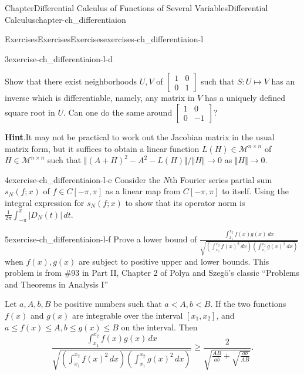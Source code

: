 \documentclass[oneside,10pt,]{book}
\newcommand{\blocktitlefont}{\relax}
\numberwithin{equation}{section}
\newcommand{\cM}{\mathcal{M}}
\newcommand{\lt}{<}
\newcommand{\amp}{&}
\begin{document}
\begin{chapterptx}{Chapter}{Differential Calculus of Functions of Several Variables}{}{Differential Calculus}{}{}{chapter-ch_differentiaion}
\begin{exercises-section}{Exercises}{Exercises}{}{Exercises}{}{}{exercises-ch_differentiaion-l}
\begin{divisionexercise}{3}{}{}{exercise-ch_differentiaion-l-d}
\par
Show that there exist  neighborhoods \(U, V\) of \(\begin{bmatrix} 1 \amp 0 \\ 0 \amp 1\end{bmatrix}\) such that \(S:U\mapsto V\) has an inverse which is differentiable, namely, any matrix in \(V\) has a uniquely defined square root in \(U\). Can one do the same around \(\begin{bmatrix} 1 \amp 0 \\ 0 \amp -1\end{bmatrix}\)?%
\par\smallskip%
\noindent\textbf{\blocktitlefont Hint}.\hypertarget{hint-ch_differentiaion-l-d-b}{}\quad{}It may not be practical to work out the Jacobian matrix in the usual matrix form, but it suffices to obtain a linear function \(L(H)\in \cM^{n\times n}\) of \(H\in \cM^{n\times n}\) such that \(\Vert (A+H)^{2}-A^{2}-L(H)\Vert/\Vert H\Vert \to 0\) as \(\Vert H\Vert \to 0\).\end{divisionexercise}%
\begin{divisionexercise}{4}{}{}{exercise-ch_differentiaion-l-e}%
Consider the \(N\)th Fourier series partial sum \(s_{N}(f; x)\) of \(f\in C[-\pi, \pi]\) as a linear map from \(C[-\pi, \pi]\) to itself. Using the integral expression for \(s_{N}(f; x)\) to show that its operator norm is \(\frac{1}{2\pi} \int_{-\pi}^{\pi} |D_{N}(t)|\,dt\).\end{divisionexercise}%
\begin{divisionexercise}{5}{}{}{exercise-ch_differentiaion-l-f}%
Prove a lower bound of \(\frac{\int_{x_{1}}^{x_{2}}f(x)g(x)\, dx}{\sqrt{\left( \int_{x_{1}}^{x_{2}}f(x)^{2}\,dx\right) 
\left(  \int_{x_{1}}^{x_{2}}g(x)^{2}\,dx\right)    }}\) when \(f(x), g(x)\) are subject to positive upper and lower bounds. This problem is from \#93 in Part II, Chapter 2 of Polya and Szegö's classic ``Problems and Theorems in Analysis I''%
\par
Let \(a, A, b, B\) be positive numbers such that \(a\lt A, b\lt B\). If the two functions \(f(x) \) and \(g(x)\) are integrable over the interval \([x_{1}, x_{2}]\), and \(a\le f(x)\le A, b\le g(x)\le B\) on the interval. Then%
\begin{equation*}
\frac{\int_{x_{1}}^{x_{2}}f(x)g(x)\, dx}{\sqrt{\left( \int_{x_{1}}^{x_{2}}f(x)^{2}\,dx\right)  
\left(  \int_{x_{1}}^{x_{2}}g(x)^{2}\,dx\right)    }}\ge \frac{2}{\sqrt{\frac{AB}{ab}+\sqrt{\frac{ab}{AB}}}}.
\end{equation*}
%
\end{divisionexercise}%
\end{exercises-section}
\end{chapterptx}
\end{document}
